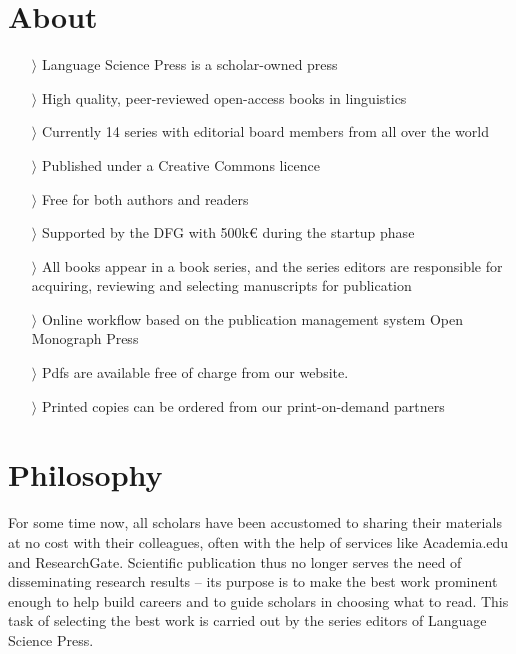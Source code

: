 \documentclass[
notumble,
nofoldmark,
]{leaflet}
\begin{document}
\section{ \sffamily   \Large About}
\begin{itemize}

 \item[$\rangle$] Language Science Press is a scholar-owned press
 \item[$\rangle$]  High quality, peer-reviewed open-access books in linguistics
  \item[$\rangle$] Currently 14 series with editorial board members from all over the world
 \item[$\rangle$] Published under a Creative Commons licence
 \item[$\rangle$] Free for both authors and readers
 \item[$\rangle$] Supported by the DFG with 500k{\euro} during the startup phase

 \item[$\rangle$] All books appear in a book series, and the series editors are responsible for acquiring, reviewing and selecting manuscripts for publication
 \item[$\rangle$] Online workflow based on the publication management system Open Monograph Press
 \item[$\rangle$] Pdfs are available free of charge from our website. 
 \item[$\rangle$] Printed copies can be ordered from our print-on-demand partners
\end{itemize}
 
 

\newpage 


\vspace*{8.9cm} 
 \section{ \sffamily   \Large  Philosophy}
 For some time now, all scholars have been accustomed to sharing their materials at no cost with their colleagues, often with the help of services like Academia.edu and ResearchGate. Scientific publication thus no longer serves the need of disseminating research results -- its purpose is to make the best work prominent enough to help build careers and to guide scholars in choosing what to read. This task of selecting the best work is carried out by the series editors of Language Science Press.
\end{document}
